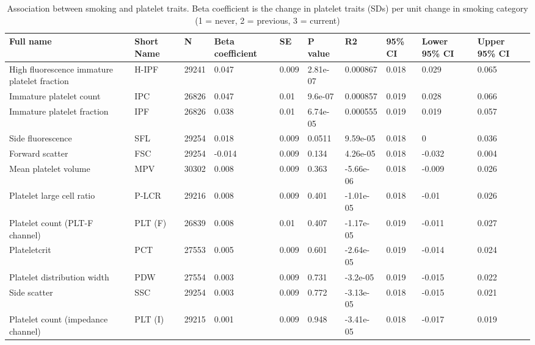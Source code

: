 \documentclass[11pt,twoside]{bristolthesis}
\begin{document}
\begin{landscape}\begin{table}

\caption[Association between smoking and platelet traits]{\label{tab:smoking-platelets}Association between smoking and platelet traits. Beta coefficient is the change in platelet traits (SDs) per unit change in smoking category (1 = never, 2 = previous, 3 = current)}
\centering
\begin{tabu} to 
\toprule
Full name & Short Name & N & Βeta coefficient & SE & P value & R2 & 95\% CI & Lower 95\% CI & Upper 95\% CI\\
\midrule
High fluorescence immature platelet fraction & H-IPF & 29241 & 0.047 & 0.009 & 2.81e-07 & 0.000867 & 0.018 & 0.029 & 0.065\\
Immature platelet count & IPC & 26826 & 0.047 & 0.01 & 9.6e-07 & 0.000857 & 0.019 & 0.028 & 0.066\\
Immature platelet fraction & IPF & 26826 & 0.038 & 0.01 & 6.74e-05 & 0.000555 & 0.019 & 0.019 & 0.057\\
Side fluorescence & SFL & 29254 & 0.018 & 0.009 & 0.0511 & 9.59e-05 & 0.018 & 0 & 0.036\\
Forward scatter & FSC & 29254 & -0.014 & 0.009 & 0.134 & 4.26e-05 & 0.018 & -0.032 & 0.004\\
\addlinespace
Mean platelet volume & MPV & 30302 & 0.008 & 0.009 & 0.363 & -5.66e-06 & 0.018 & -0.009 & 0.026\\
Platelet large cell ratio & P-LCR & 29216 & 0.008 & 0.009 & 0.401 & -1.01e-05 & 0.018 & -0.01 & 0.026\\
Platelet count (PLT-F channel) & PLT (F) & 26839 & 0.008 & 0.01 & 0.407 & -1.17e-05 & 0.019 & -0.011 & 0.027\\
Plateletcrit & PCT & 27553 & 0.005 & 0.009 & 0.601 & -2.64e-05 & 0.019 & -0.014 & 0.024\\
Platelet distribution width & PDW & 27554 & 0.003 & 0.009 & 0.731 & -3.2e-05 & 0.019 & -0.015 & 0.022\\
\addlinespace
Side scatter & SSC & 29254 & 0.003 & 0.009 & 0.772 & -3.13e-05 & 0.018 & -0.015 & 0.021\\
Platelet count (impedance channel) & PLT (I) & 29215 & 0.001 & 0.009 & 0.948 & -3.41e-05 & 0.018 & -0.017 & 0.019\\
\bottomrule
\end{tabu}
\end{table}
\end{landscape}
\end{document}
